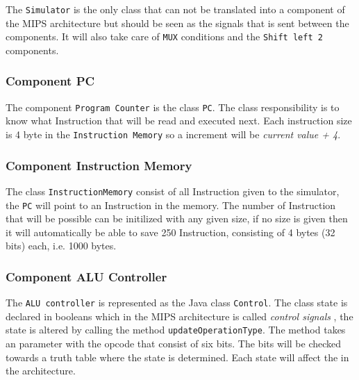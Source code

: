 The \texttt{Simulator} is the only class that can not be translated
into a component of the MIPS architecture but should be seen as the
signals that is sent between the components. It will also take care of
\texttt{MUX} conditions and the \texttt{Shift left 2} components.


\subsubsection{Component PC}

The component \texttt{Program Counter} is the class \texttt{PC}. The
class responsibility is to know what Instruction that will be read and
executed next. Each instruction size is 4 byte in the
\texttt{Instruction Memory} so a increment will be \emph{current value
  + 4}.

\subsubsection{Component Instruction Memory}

The class \texttt{InstructionMemory} consist of all Instruction given
to the simulator, the \texttt{PC} will point to an Instruction in the
memory. The number of Instruction that will be possible can be
initilized with any given size, if no size is given then it will
automatically be able to save 250 Instruction, consisting of 4 bytes
(32 bits) each, i.e. 1000 bytes.

\newpage

\subsubsection{Component ALU Controller}

The \texttt{ALU controller} is represented as the Java class
\texttt{Control}. The class state is declared in booleans which in the
MIPS architecture is called \emph{control signals} , the state is
altered by calling the method \texttt{updateOperationType}. The method
takes an parameter with the opcode that consist of six bits. The bits
will be checked towards a truth table where the state is
determined. Each state will affect the in the architecture.

